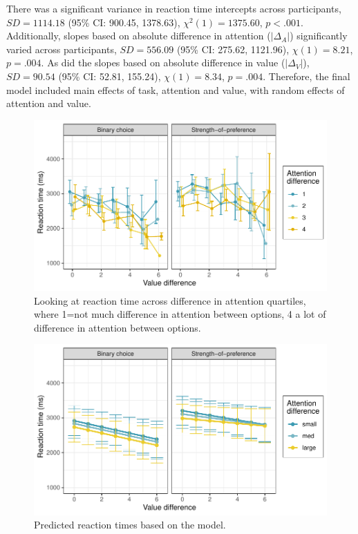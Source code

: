 \documentclass[12pt]{article}
\begin{document}


There was a significant variance in reaction time intercepts across participants, $SD=1114.18$ (95\% CI: 900.45, 1378.63), $\chi^2(1)=1375.60$, $p<.001$. Additionally, slopes based on absolute difference in attention ($|\Delta_A|$) significantly varied across participants, $SD=556.09$ (95\% CI: 275.62, 1121.96), $\chi(1)=8.21$, $p=.004$. As did the slopes based on absolute difference in value ($|\Delta_V|$), $SD=90.54$ (95\% CI: 52.81, 155.24), $\chi(1)=8.34$, $p=.004$. Therefore, the final model included main effects of task, attention and value, with random effects of attention and value. 





\begin{figure}[b!]
	\centering
	\includegraphics{images/RTattentionValueGraph}
	\caption{Looking at reaction time across difference in attention quartiles, where 1=not much difference in attention between options, 4 a lot of difference in attention between options.}
	\label{figure:RTattentionValueGraph}
\end{figure}

\begin{figure}[b!]
	\centering
	\includegraphics{images/predictedRTattentionValueGraph.pdf}
	\caption{Predicted reaction times based on the model.}
	\label{figure:predictedRTattentionValueGraph}
\end{figure}
\end{document}
